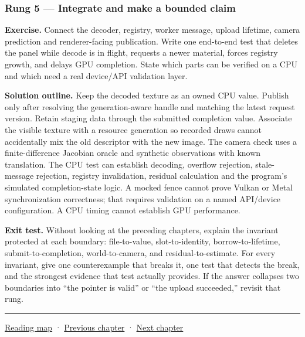 \subsubsection{Rung 5 --- Integrate and make a bounded claim}\label{rung-5-integrate-and-make-a-bounded-claim}

\textbf{Exercise.} Connect the decoder, registry, worker message, upload lifetime, camera prediction and renderer-facing publication. Write one end-to-end test that deletes the panel while decode is in flight, requests a newer material, forces registry growth, and delays GPU completion. State which parts can be verified on a CPU and which need a real device/API validation layer.

\textbf{Solution outline.} Keep the decoded texture as an owned CPU value. Publish only after resolving the generation-aware handle and matching the latest request version. Retain staging data through the submitted completion value. Associate the visible texture with a resource generation so recorded draws cannot accidentally mix the old descriptor with the new image. The camera check uses a finite-difference Jacobian oracle and synthetic observations with known translation. The CPU test can establish decoding, overflow rejection, stale-message rejection, registry invalidation, residual calculation and the program's simulated completion-state logic. A mocked fence cannot prove Vulkan or Metal synchronization correctness; that requires validation on a named API/device configuration. A CPU timing cannot establish GPU performance.

\textbf{Exit test.} Without looking at the preceding chapters, explain the invariant protected at each boundary: file-to-value, slot-to-identity, borrow-to-lifetime, submit-to-completion, world-to-camera, and residual-to-estimate. For every invariant, give one counterexample that breaks it, one test that detects the break, and the strongest evidence that test actually provides. If the answer collapses two boundaries into ``the pointer is valid'' or ``the upload succeeded,'' revisit that rung.

\begin{center}\rule{0.5\linewidth}{0.5pt}\end{center}

\href{Chapter\%20Edition/01\%20-\%20Computing\%20Foundations/00\%20-\%20Reading\%20Map}{Reading map} · \hyperref[02-foundations-ii-ch037]{Previous chapter} · \hyperref[02-foundations-ii-ch039]{Next chapter}
